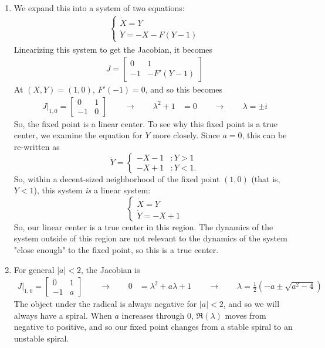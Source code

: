 \documentclass[10pt,letterpaper]{report}
\newcommand{\so}{\qquad \rightarrow \qquad}
\newcommand{\abs}[1]{\left|{#1}\right|}
\newcommand{\mtx}[2]{\left[\begin{array}{#1}#2\end{array}\right]}
\begin{document}
\begin{enumerate}
\begin{enumerate}
    \item We expand this into a system of two equations:
    \begin{align*}
        \begin{cases}
        \dot X = Y \\
        \dot Y = -X - F(Y - 1)
        \end{cases}
    \end{align*}
    Linearizing this system to get the Jacobian, it becomes
    \begin{align*}
        J = \mtx{cc}{0 & 1 \\ -1 & -F'(Y - 1)}
    \end{align*}
    At $(X, Y) = (1, 0)$, $F'(- 1) = 0$, and so this becomes
    \begin{align*}
        J\big\vert_{1,0} = \mtx{cc}{0 & 1 \\ -1 & 0}
        \so
        \lambda^2 +1 &= 0 \so \lambda = \pm i
    \end{align*}
    So, the fixed point is a linear center. To see why this fixed point is a true center, we examine the equation for $\dot Y$ more closely. Since $a = 0$, this can be re-written as
    \[
    \dot Y = \begin{cases}
    -X - 1 &: Y > 1 \\
    -X + 1 &: Y < 1.
    \end{cases}
    \]
    So, within a decent-sized neighborhood of the fixed point $(1, 0)$ (that is, $Y < 1$), this system \textit{is} a linear system:
    \[
    \begin{cases}
        \dot X = Y \\
        \dot Y = -X + 1
    \end{cases}
    \]
    So, our linear center is a true center in this region. The dynamics of the system outside of this region are not relevant to the dynamics of the system "close enough" to the fixed point, so this is a true center.
    
    \item For general $\abs a < 2$, the Jacobian is
    \begin{align*}
        J\big\vert_{1,0} = \mtx{cc}{0 & 1 \\ -1 & a}
        \so
        0 &= \lambda^2 + a\lambda + 1 \so
        \lambda = \frac{1}{2}\left(-a \pm \sqrt{a^2 - 4}\right)
    \end{align*}
    The object under the radical is always negative for $\abs a < 2$, and so we will always have a spiral. When $a$ increases through 0, $\Re(\lambda)$ moves from negative to positive, and so our fixed point changes from a stable spiral to an unstable spiral.
    

\end{enumerate}
\end{enumerate}
\end{document}
